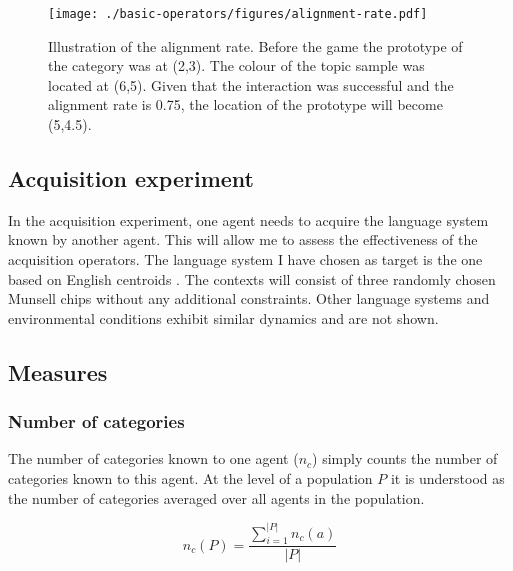 \begin{figure}[htbp]
  \begin{center}
    \texttt{[image: ./basic-operators/figures/alignment-rate.pdf]}
    \caption[Illustration of the alignment rate]{Illustration of the
      alignment rate. Before the game the prototype of the category
      was at (2,3). The colour of the topic sample was located at
      (6,5). Given that the interaction was successful and the
      alignment rate is 0.75, the location of the prototype will
      become (5,4.5).}
    \label{f:alignment-rate}
  \end{center}
\end{figure}

\subsection{Acquisition experiment}

In the acquisition experiment, one agent needs to acquire the language
system known by another agent. This will allow me to assess the
effectiveness of the acquisition operators. The language system I have
chosen as target is the one based on English centroids
\citep{sturges95location}. The contexts will consist of three randomly
chosen Munsell chips \citep{newhall42final} without any additional
constraints. Other language systems and environmental conditions
exhibit similar dynamics and are not shown.

\subsection{Measures}

\subsubsection{Number of categories}

The number of categories known to one agent ($n_c$) simply counts the
number of categories known to this agent. At the level of a population
$P$ it is understood as the number of categories averaged over all
agents in the population.

\begin{equation}
n_c(P) = \frac{\displaystyle \sum_{i=1}^{|P|} n_c(a)}{|P|}
\label{eq:number-of-categories-population}
\end{equation}

